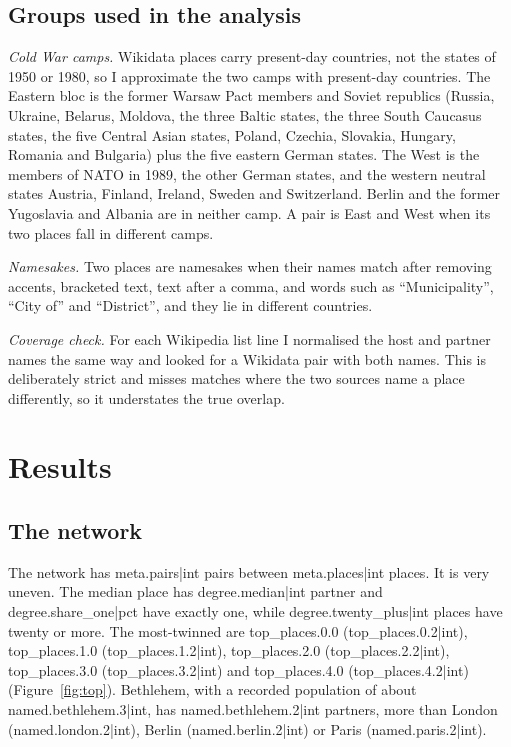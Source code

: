 \documentclass[11pt,a4paper]{article}
\begin{document}
\subsection{Groups used in the analysis}

\emph{Cold War camps.} Wikidata places carry present-day countries, not the states of 1950 or 1980, so I approximate the two camps with present-day countries. The Eastern bloc is the former Warsaw Pact members and Soviet republics (Russia, Ukraine, Belarus, Moldova, the three Baltic states, the three South Caucasus states, the five Central Asian states, Poland, Czechia, Slovakia, Hungary, Romania and Bulgaria) plus the five eastern German states. The West is the members of NATO in 1989, the other German states, and the western neutral states Austria, Finland, Ireland, Sweden and Switzerland. Berlin and the former Yugoslavia and Albania are in neither camp. A pair is East and West when its two places fall in different camps.

\emph{Namesakes.} Two places are namesakes when their names match after removing accents, bracketed text, text after a comma, and words such as ``Municipality'', ``City of'' and ``District'', and they lie in different countries.

\emph{Coverage check.} For each Wikipedia list line I normalised the host and partner names the same way and looked for a Wikidata pair with both names. This is deliberately strict and misses matches where the two sources name a place differently, so it understates the true overlap.

\section{Results}

\subsection{The network}

The network has {{meta.pairs|int}} pairs between {{meta.places|int}} places. It is very uneven. The median place has {{degree.median|int}} partner and {{degree.share_one|pct}} have exactly one, while {{degree.twenty_plus|int}} places have twenty or more. The most-twinned are {{top_places.0.0}} ({{top_places.0.2|int}}), {{top_places.1.0}} ({{top_places.1.2|int}}), {{top_places.2.0}} ({{top_places.2.2|int}}), {{top_places.3.0}} ({{top_places.3.2|int}}) and {{top_places.4.0}} ({{top_places.4.2|int}}) (Figure~\ref{fig:top}). Bethlehem, with a recorded population of about {{named.bethlehem.3|int}}, has {{named.bethlehem.2|int}} partners, more than London ({{named.london.2|int}}), Berlin ({{named.berlin.2|int}}) or Paris ({{named.paris.2|int}}).
\end{document}
